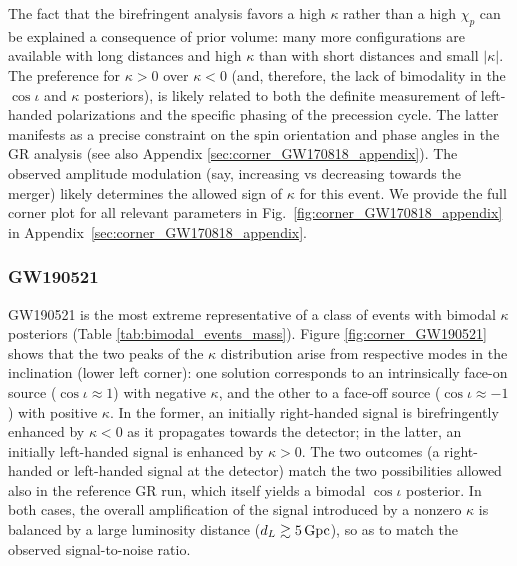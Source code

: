 \documentclass[aps,prd,twocolumn,superscriptaddress,preprintnumbers,floatfix,nofootinbib]{revtex4-2}
\begin{document}
The fact that the birefringent analysis favors a high $\kappa$ rather than a high $\chi_p$ can be explained a consequence of prior volume: many more configurations are available with long distances and high $\kappa$ than with short distances and small $|\kappa|$.
The preference for $\kappa > 0$ over $\kappa < 0$ (and, therefore, the lack of bimodality in the $\cos\iota$ and $\kappa$ posteriors), is likely related to both the definite measurement of left-handed polarizations and the specific phasing of the precession cycle.
The latter manifests as a precise constraint on the spin orientation and phase angles in the \ac{GR} analysis \cite{Varma:2021csh} (see also Appendix \ref{sec:corner_GW170818_appendix}).
The observed amplitude modulation (say, increasing vs decreasing towards the merger) likely determines the allowed sign of $\kappa$ for this event.
We provide the full corner plot for all relevant parameters in Fig.~\ref{fig:corner_GW170818_appendix} in Appendix~\ref{sec:corner_GW170818_appendix}.

\subsubsection{GW190521}
\label{sec:GW190521}

GW190521 is the most extreme representative of a class of events with bimodal $\kappa$ posteriors (Table \ref{tab:bimodal_events_mass}).
Figure \ref{fig:corner_GW190521} shows that the two peaks of the $\kappa$ distribution arise from respective modes in the inclination (lower left corner): one solution corresponds to an intrinsically face-on source ($\cos\iota \approx 1$) with negative $\kappa$, and the other to a face-off source ($\cos\iota \approx -1$) with positive $\kappa$.
In the former, an initially right-handed signal is birefringently enhanced by $\kappa < 0$ as it propagates towards the detector; in the latter, an initially left-handed signal is enhanced by $\kappa > 0$.
The two outcomes (a right-handed or left-handed signal at the detector) match the two possibilities allowed also in the reference \ac{GR} run, which itself yields a bimodal $\cos\iota$ posterior.
In both cases, the overall amplification of the signal introduced by a nonzero $\kappa$ is balanced by a large luminosity distance ($d_L \gtrsim 5 \, {\rm Gpc}$), so as to match the observed signal-to-noise ratio.
\end{document}
